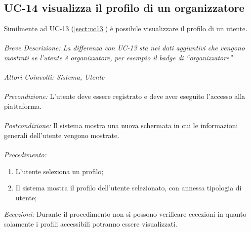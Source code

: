 \subsection{UC-14 visualizza il profilo di un organizzatore}
Similmente ad UC-13 (\ref{sect:uc13}) è possibile visualizzare il profilo di un utente.
\\
\\
\textit{Breve Descrizione: La differenza con UC-13 sta nei dati aggiuntivi che vengono mostrati se l'utente è organizzatore, per esempio il badge di ``organizzatore''} 
\\
\\
\textit{Attori Coinvolti: Sistema, Utente}
\\
\\
\textit{Precondizione:} L'utente deve essere registrato e deve aver eseguito l'accesso alla piattaforma.
\\
\\
\textit{Postcondizione:} Il sistema mostra una nuova schermata in cui le informazioni generali dell'utente vengono mostrate.
\\
\\
\textit{Procedimento:}
\begin{enumerate}
	\item L'utente seleziona un profilo;
	\item Il sistema mostra il profilo dell'utente selezionato, con annessa tipologia di utente;
\end{enumerate}

\textit{Eccezioni:} Durante il procedimento non si possono verificare eccezioni in quanto solamente i profili accessibili potranno essere visualizzati.
